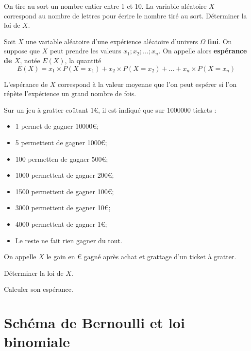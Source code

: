 \documentclass{poly}
\begin{document}
\begin{example}
On tire au sort un nombre entier entre $1$ et $10$. La variable aléatoire $X$ correspond au nombre de lettres pour écrire le nombre tiré au sort. Déterminer la loi de $X$.  
\end{example}
\newpage
\begin{definition}
Soit $X$ une variable aléatoire d'une expérience aléatoire d'univers $\Omega$ \textbf{fini}. On suppose que $X$ peut prendre les valeurs $x_1; x_2; \dots; x_n$. On appelle alors \textbf{espérance de $X$}, notée $E(X)$, la quantité
\begin{equation*}
E(X) = x_1 \times P(X=x_1) + x_2 \times P(X = x_2) + \dots + x_n \times P(X = x_n)
\end{equation*} 
\end{definition}
\begin{remark}
L'espérance de $X$ correspond à la valeur moyenne que l'on peut espérer si l'on répète l'expérience un grand nombre de fois.
\end{remark}
\begin{example}
Sur un jeu à gratter coûtant \num{1}€, il est indiqué que sur \num{1000000} tickets :
\begin{itemize}
\item \num{1} permet de gagner \num{10000}€; 
\item \num{5} permettent de gagner \num{1000}€; 
\item \num{100} permetten de gagner \num{500}€; 
\item \num{1000} permettent de gagner \num{200}€; 
\item \num{1500} permettent de gagner \num{100}€; 
\item \num{3000} permettent de gagner \num{10}€;
\item \num{4000} permettent de gagner \num{1}€;
\item Le reste ne fait rien gagner du tout.
\end{itemize}
On appelle $X$ le gain en € gagné après achat et grattage d'un ticket à gratter.
\begin{alphaquestions}
\item Déterminer la loi de $X$.
\item Calculer son espérance.
\end{alphaquestions}

\end{example}
\newpage
\section{Schéma de Bernoulli et loi binomiale}
\end{document}
